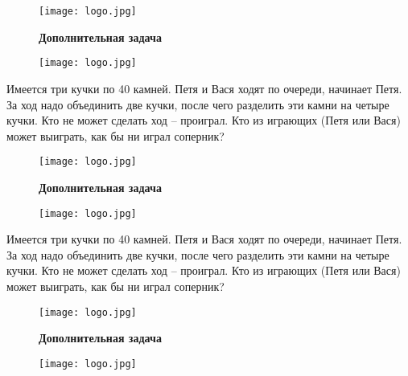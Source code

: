 \documentclass[12 pt, a4paper]{article}%
\begin{document}
	\newpage
	\large
	\raggedright
	\vspace{-2ex}
	\begin{figure}[H]
		\begin{minipage}[h]{0.33\linewidth}
			\texttt{[image: logo.jpg]}
		\end{minipage}
		\begin{minipage}[h]{0.3\linewidth}
			\centering
			\large{\textbf{Дополнительная задача}}\\
		\end{minipage}
		\begin{minipage}[h]{0.33\linewidth}
			\texttt{[image: logo.jpg]}
		\end{minipage}
		\label{ris:image1}
	\end{figure}
	\vspace{-2ex}
	Имеется три кучки по 40 камней. Петя и Вася ходят по очереди, начинает Петя. За ход надо объединить две кучки, после чего разделить эти камни на четыре кучки. Кто не может сделать ход – проиграл. Кто из играющих (Петя или Вася) может выиграть, как бы ни играл соперник?\\
	\vspace{4ex}
		\begin{figure}[H]
		\begin{minipage}[h]{0.33\linewidth}
			\texttt{[image: logo.jpg]}
		\end{minipage}
		\begin{minipage}[h]{0.3\linewidth}
			\centering
			\large{\textbf{Дополнительная задача}}\\
		\end{minipage}
		\begin{minipage}[h]{0.33\linewidth}
			\texttt{[image: logo.jpg]}
		\end{minipage}
		\label{ris:image1}
	\end{figure}
	\vspace{-2ex}
	Имеется три кучки по 40 камней. Петя и Вася ходят по очереди, начинает Петя. За ход надо объединить две кучки, после чего разделить эти камни на четыре кучки. Кто не может сделать ход – проиграл. Кто из играющих (Петя или Вася) может выиграть, как бы ни играл соперник?\\
	\vspace{4ex}
		\begin{figure}[H]
		\begin{minipage}[h]{0.33\linewidth}
			\texttt{[image: logo.jpg]}
		\end{minipage}
		\begin{minipage}[h]{0.3\linewidth}
			\centering
			\large{\textbf{Дополнительная задача}}\\
		\end{minipage}
		\begin{minipage}[h]{0.33\linewidth}
			\texttt{[image: logo.jpg]}
		\end{minipage}
		\label{ris:image1}
	\end{figure}
\end{document}
